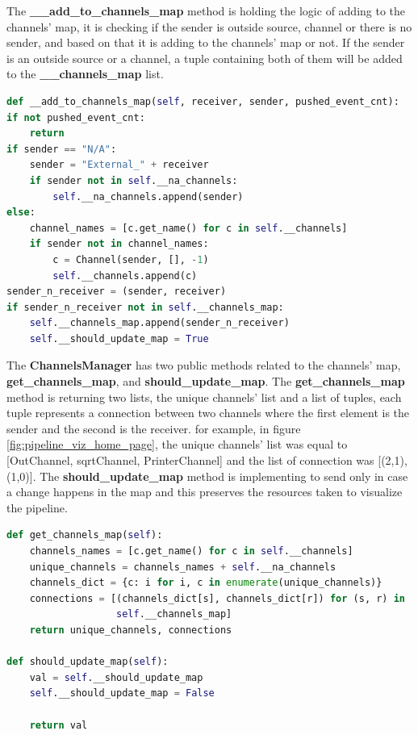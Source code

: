 The \textbf{\_\_add\_to\_channels\_map} method is holding the logic of adding to the channels' map,
it is checking if the sender is outside source, channel or there is no sender, and based on that it is adding
to the channels' map or not. If the sender is an outside source or a channel, a tuple containing both of them
will be added to the \textbf{\_\_channels\_map} list.
\newline
\begin{lstlisting}[language=Python, caption={Add to channels' map},captionpos=b]
def __add_to_channels_map(self, receiver, sender, pushed_event_cnt):
if not pushed_event_cnt:
	return
if sender == "N/A":
	sender = "External_" + receiver
	if sender not in self.__na_channels:
		self.__na_channels.append(sender)
else:
	channel_names = [c.get_name() for c in self.__channels]
	if sender not in channel_names:
		c = Channel(sender, [], -1)
		self.__channels.append(c)
sender_n_receiver = (sender, receiver)
if sender_n_receiver not in self.__channels_map:
	self.__channels_map.append(sender_n_receiver)
	self.__should_update_map = True	
\end{lstlisting}

The \textbf{ChannelsManager} has two public methods related to the channels' map, \textbf{get\_channels\_map}, 
and \textbf{should\_update\_map}. The \textbf{get\_channels\_map} method is returning two lists, the unique channels'
list and a list of tuples, each tuple represents a connection between two channels where the first element
is the sender and the second is the receiver. for example, in figure \ref{fig:pipeline_viz_home_page}, the unique
channels' list was equal to [OutChannel, sqrtChannel, PrinterChannel] and the list of connection was 
[(2,1),(1,0)]. The \textbf{should\_update\_map} method is implementing to send only in case a change happens
in the map and this preserves the resources taken to visualize the pipeline.
\newline
\begin{lstlisting}[language=Python, caption={Public methods for channels' map},captionpos=b]
def get_channels_map(self):
	channels_names = [c.get_name() for c in self.__channels]
	unique_channels = channels_names + self.__na_channels
	channels_dict = {c: i for i, c in enumerate(unique_channels)}
	connections = [(channels_dict[s], channels_dict[r]) for (s, r) in
				   self.__channels_map]
	return unique_channels, connections

def should_update_map(self):
	val = self.__should_update_map
	self.__should_update_map = False

	return val
\end{lstlisting}

